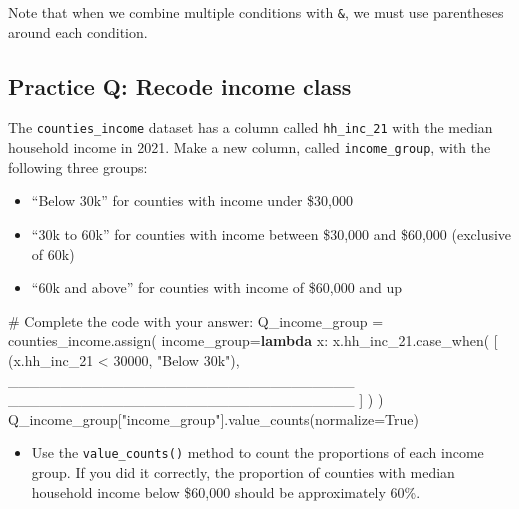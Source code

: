 \documentclass[
  letterpaper,
  DIV=11,
  numbers=noendperiod]{scrreprt}
\newenvironment{Shaded}{\begin{snugshade}}{\end{snugshade}}
\newcommand{\CommentTok}[1]{\textcolor[rgb]{0.37,0.37,0.37}{#1}}
\newcommand{\DecValTok}[1]{\textcolor[rgb]{0.68,0.00,0.00}{#1}}
\newcommand{\KeywordTok}[1]{\textcolor[rgb]{0.00,0.23,0.31}{\textbf{#1}}}
\newcommand{\NormalTok}[1]{\textcolor[rgb]{0.00,0.23,0.31}{#1}}
\newcommand{\OperatorTok}[1]{\textcolor[rgb]{0.37,0.37,0.37}{#1}}
\newcommand{\StringTok}[1]{\textcolor[rgb]{0.13,0.47,0.30}{#1}}
\newcommand{\VariableTok}[1]{\textcolor[rgb]{0.07,0.07,0.07}{#1}}
\providecommand{\tightlist}{%
  \setlength{\itemsep}{0pt}\setlength{\parskip}{0pt}}\usepackage{longtable,booktabs,array}
\begin{document}
Note that when we combine multiple conditions with \texttt{\&}, we must
use parentheses around each condition.

\begin{tcolorbox}[enhanced jigsaw, colframe=quarto-callout-tip-color-frame, opacityback=0, titlerule=0mm, bottomrule=.15mm, breakable, leftrule=.75mm, colbacktitle=quarto-callout-tip-color!10!white, title=\textcolor{quarto-callout-tip-color}{\faLightbulb}\hspace{0.5em}{Practice}, rightrule=.15mm, coltitle=black, opacitybacktitle=0.6, colback=white, left=2mm, arc=.35mm, toptitle=1mm, bottomtitle=1mm, toprule=.15mm]

\subsection{Practice Q: Recode income
class}\label{practice-q-recode-income-class}

The \texttt{counties\_income} dataset has a column called
\texttt{hh\_inc\_21} with the median household income in 2021. Make a
new column, called \texttt{income\_group}, with the following three
groups:

\begin{itemize}
\tightlist
\item
  ``Below 30k'' for counties with income under \$30,000
\item
  ``30k to 60k'' for counties with income between \$30,000 and \$60,000
  (exclusive of 60k)
\item
  ``60k and above'' for counties with income of \$60,000 and up
\end{itemize}

\begin{Shaded}
\begin{Highlighting}[]
\CommentTok{\# Complete the code with your answer:}
\NormalTok{Q\_income\_group }\OperatorTok{=}\NormalTok{ counties\_income.assign(}
\NormalTok{    income\_group}\OperatorTok{=}\KeywordTok{lambda}\NormalTok{ x: x.hh\_inc\_21.case\_when(}
\NormalTok{        [}
\NormalTok{            (x.hh\_inc\_21 }\OperatorTok{\textless{}} \DecValTok{30000}\NormalTok{, }\StringTok{"Below 30k"}\NormalTok{),}
\NormalTok{            \_\_\_\_\_\_\_\_\_\_\_\_\_\_\_\_\_\_\_\_\_\_\_\_\_\_\_\_\_\_\_\_\_}
\NormalTok{            \_\_\_\_\_\_\_\_\_\_\_\_\_\_\_\_\_\_\_\_\_\_\_\_\_\_\_\_\_\_\_\_\_}
\NormalTok{        ]}
\NormalTok{    )}
\NormalTok{)}
\NormalTok{Q\_income\_group[}\StringTok{"income\_group"}\NormalTok{].value\_counts(normalize}\OperatorTok{=}\VariableTok{True}\NormalTok{)}
\end{Highlighting}
\end{Shaded}

\begin{itemize}
\tightlist
\item
  Use the \texttt{value\_counts()} method to count the proportions of
  each income group. If you did it correctly, the proportion of counties
  with median household income below \$60,000 should be approximately
  60\%.
\end{itemize}

\end{tcolorbox}
\end{document}
